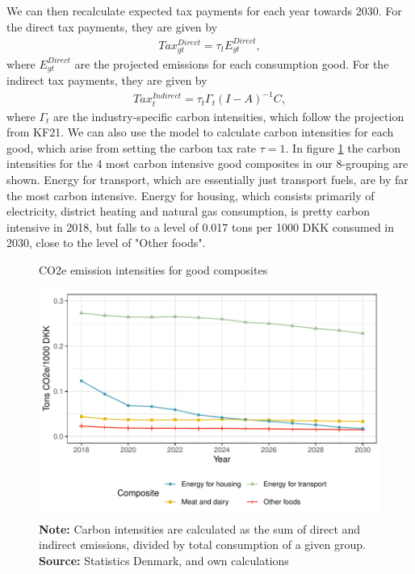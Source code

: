 We can then recalculate expected tax payments for each year towards 2030. For the direct tax payments, they are given by
\begin{align}
    Tax^{Direct}_{gt} = \tau_t E^{Direct}_{gt},
\end{align}
where $E^{Direct}_{gt}$ are the projected emissions for each consumption good. For the indirect tax payments, they are given by
\begin{align} 
    Tax^{Indirect}_t = \tau_t \Gamma_t (I-A)^{-1} C,
\end{align}
where $\Gamma_t$ are the industry-specific carbon intensities, which follow the projection from KF21. We can also use the model to calculate carbon intensities for each good, which arise from setting the carbon tax rate $\tau=1$. In figure \ref{carbonintens2030} the carbon intensities for the 4 most carbon intensive good composites in our 8-grouping are shown. Energy for transport, which are essentially just transport fuels, are by far the most carbon intensive. Energy for housing, which consists primarily of electricity, district heating and natural gas consumption, is pretty carbon intensive in 2018, but falls to a level of 0.017 tons per 1000 DKK consumed in 2030, close to the level of "Other foods". 

\begin{figure}[H]
\centering
\caption{CO2e emission intensities for good composites}
\label{carbonintens2030}
\includegraphics[width=.9\textwidth]{Figures/intens21.pdf}
\captionsetup{singlelinecheck=off,size=scriptsize}
\setlength{\captionmargin}{10pt}
\caption*{
\textbf{Note:} Carbon intensities are calculated as the sum of direct and indirect emissions, divided by total consumption of a given group. \\
\textbf{Source:} Statistics Denmark, \cite{kf21} and own calculations}
\end{figure}

